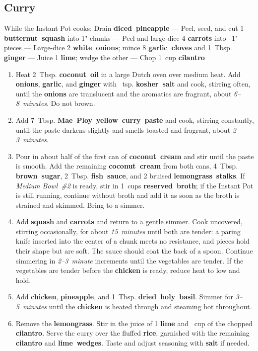 \documentclass[11pt,letterpaper]{article}
\begin{document}
\subsection*{Curry}

\noindent
While the Instant Pot cooks: Drain \textbf{diced~pineapple} ---
Peel, seed, and cut 1 \textbf{butternut~squash} into 1" chunks ---
Peel and large-dice 4 \textbf{carrots} into --1" pieces ---
Large-dice 2 \textbf{white~onions}; mince 8 \textbf{garlic~cloves} and 1~Tbsp. \textbf{ginger} ---
Juice 1 \textbf{lime}; wedge the other ---
Chop 1~cup \textbf{cilantro}

\begin{enumerate}
    \item Heat 2~Tbsp. \textbf{coconut~oil} in a large Dutch oven over medium heat. Add \textbf{onions}, \textbf{garlic}, and \textbf{ginger} with ~tsp. \textbf{kosher~salt} and cook, stirring often, until the \textbf{onions} are translucent and the aromatics are fragrant, about \textit{6--8~minutes}. Do not brown.

    \item Add 7~Tbsp. \textbf{Mae~Ploy~yellow~curry~paste} and cook, stirring constantly, until the paste darkens slightly and smells toasted and fragrant, about \textit{2--3~minutes}.

    \item Pour in about half of the first can of \textbf{coconut~cream} and stir until the paste is smooth. Add the remaining \textbf{coconut~cream} from both cans, 4~Tbsp. \textbf{brown~sugar}, 2~Tbsp. \textbf{fish~sauce}, and 2 bruised \textbf{lemongrass~stalks}. If \textit{Medium Bowl~\#2} is ready, stir in 1~cups \textbf{reserved~broth}; if the Instant Pot is still running, continue without broth and add it as soon as the broth is strained and skimmed. Bring to a simmer.

    \item Add \textbf{squash} and \textbf{carrots} and return to a gentle simmer. Cook uncovered, stirring occasionally, for about \textit{15~minutes} until both are tender: a paring knife inserted into the center of a chunk meets no resistance, and pieces hold their shape but are soft. The sauce should coat the back of a spoon. Continue simmering in \textit{2--3~minute} increments until the vegetables are tender. If the vegetables are tender before the \textbf{chicken} is ready, reduce heat to low and hold.

    \item Add \textbf{chicken}, \textbf{pineapple}, and 1~Tbsp. \textbf{dried~holy~basil}. Simmer for \textit{3--5~minutes} until the \textbf{chicken} is heated through and steaming hot throughout. 

    \item Remove the \textbf{lemongrass}. Stir in the juice of 1 \textbf{lime} and ~cup of the chopped \textbf{cilantro}. Serve the curry over the fluffed \textbf{rice}, garnished with the remaining \textbf{cilantro} and \textbf{lime~wedges}. Taste and adjust seasoning with \textbf{salt} if needed.
\end{enumerate}
\end{document}
